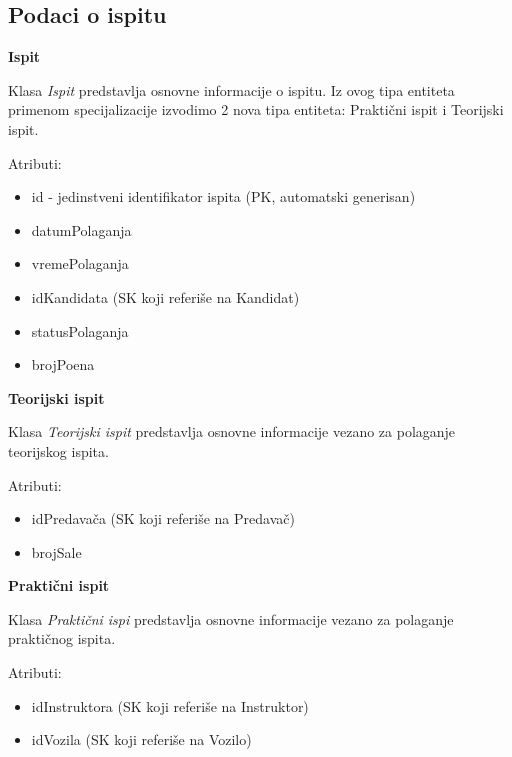 \subsection{Podaci o ispitu}

\textbf{\large Ispit}
\vspace{0.3cm}

Klasa \textit{Ispit} predstavlja osnovne informacije o ispitu. Iz ovog tipa entiteta primenom specijalizacije izvodimo 2 nova tipa entiteta: Praktični ispit i Teorijski ispit.

Atributi:
\begin{itemize}
    \item id - jedinstveni identifikator ispita (PK, automatski generisan)
    \item datumPolaganja 
    \item vremePolaganja
    \item idKandidata (SK koji referiše na Kandidat)
    \item statusPolaganja
    \item brojPoena
\end{itemize}

\textbf{\large Teorijski ispit}
\vspace{0.3cm}

Klasa \textit{Teorijski ispit} predstavlja osnovne informacije vezano za polaganje teorijskog ispita.

Atributi:
\begin{itemize}
    \item idPredavača (SK koji referiše na Predavač)
    \item brojSale
\end{itemize}

\textbf{\large Praktični ispit}
\vspace{0.3cm}

Klasa \textit{Praktični ispi} predstavlja osnovne informacije vezano za polaganje praktičnog ispita.

Atributi:
\begin{itemize}
    \item idInstruktora (SK koji referiše na Instruktor)
    \item idVozila (SK koji referiše na Vozilo)
\end{itemize}


